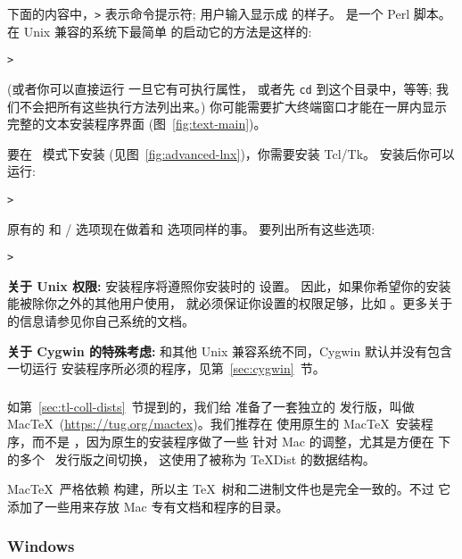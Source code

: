 \documentclass{article}
\begin{document}
下面的内容中，\texttt{>} 表示命令提示符; 用户输入显示成  的样子。
 是一个 Perl 脚本。在 Unix 兼容的系统下最简单
的启动它的方法是这样的: 
\begin{alltt}
> 
\end{alltt}
(或者你可以直接运行  一旦它有可执行属性，
或者先 \texttt{cd} 到这个目录中，等等; 
我们不会把所有这些执行方法列出来。)
你可能需要扩大终端窗口才能在一屏内显示完整的文本安装程序界面
(图~\ref{fig:text-main})。

要在 \GUI\ 模式下安装 (见图~\ref{fig:advanced-lnx})，你需要安装 Tcl/Tk。
安装后你可以运行: 
\begin{alltt}
> 
\end{alltt}

原有的  和 / 选项现在做着和  选项同样的事。
要列出所有这些选项: 
\begin{alltt}
> 
\end{alltt}

\textbf{关于 Unix 权限: } \TL{} 安装程序将遵照你安装时的  设置。
因此，如果你希望你的安装能被除你之外的其他用户使用，
就必须保证你设置的权限足够，比如 。更多关于
 的信息请参见你自己系统的文档。

\textbf{关于 Cygwin 的特殊考虑: } 和其他 Unix 兼容系统不同，Cygwin
默认并没有包含一切运行 \TL{} 安装程序所必须的程序，见第~\ref{sec:cygwin}~节。

\subsubsection{\macOS{}}
\label{sec:macosx}

如第~\ref{sec:tl-coll-dists}~节提到的，我们给 \macOS{} 准备了一套独立的
发行版，叫做 Mac\TeX\ (\url{https://tug.org/mactex})。我们推荐在 \macOS{}
使用原生的 Mac\TeX\ 安装程序，而不是 \TL，因为原生的安装程序做了一些
针对 Mac 的调整，尤其是方便在 \macOS{} 下的多个 \TL\ 发行版之间切换，
这使用了被称为 \TeX{}Dist 的数据结构。

Mac\TeX\ 严格依赖 \TL 构建，所以主 \TeX\ 树和二进制文件也是完全一致的。不过
它添加了一些用来存放 Mac 专有文档和程序的目录。

\subsubsection{Windows}\label{sec:wininst}
\end{document}
